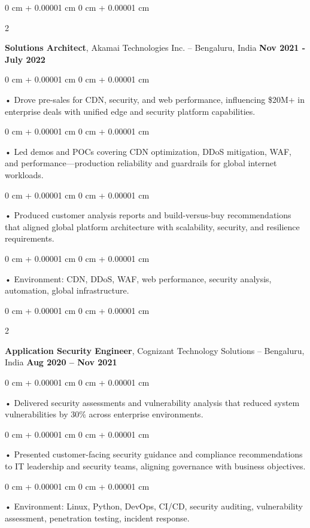 \documentclass[10pt, letterpaper]{article}
\newenvironment{onecolentry}{
    \begin{adjustwidth}{
        0 cm + 0.00001 cm
    }{
        0 cm + 0.00001 cm
    }
}{
    \end{adjustwidth}
} %
\newenvironment{twocolentry}[2][]{
    \onecolentry
    \def\secondColumn{#2}
    \setcolumnwidth{\fill, 4.5 cm}
    \begin{paracol}{2}
}{
    \switchcolumn \raggedleft \secondColumn
    \end{paracol}
    \endonecolentry
} %
\begin{document}
        \begin{twocolentry}{
            \textbf{Nov 2021 - July 2022}
        }
            \textbf{Solutions Architect}, Akamai Technologies Inc. -- Bengaluru, India \end{twocolentry}
        \begin{onecolentry}
            • Drove pre-sales for CDN, security, and web performance, influencing \$20M+ in enterprise deals with unified edge and security platform capabilities.
        \end{onecolentry}
        \begin{onecolentry}
            • Led demos and POCs covering CDN optimization, DDoS mitigation, WAF, and performance---production reliability and guardrails for global internet workloads.
        \end{onecolentry}
        \begin{onecolentry}
             • Produced customer analysis reports and build-versus-buy recommendations that aligned global platform architecture with scalability, security, and resilience requirements.
        \end{onecolentry}
        \begin{onecolentry}
             • Environment: CDN, DDoS, WAF, web performance, security analysis, automation, global infrastructure.
        \end{onecolentry}

        \begin{twocolentry}{
            \textbf{Aug 2020 – Nov 2021}
        }
            \vspace{2 pt }
            \textbf{Application Security Engineer}, Cognizant Technology Solutions -- Bengaluru, India\end{twocolentry}
        \begin{onecolentry}
             • Delivered security assessments and vulnerability analysis that reduced system vulnerabilities by 30\% across enterprise environments.
        \end{onecolentry}
        \begin{onecolentry}
             • Presented customer-facing security guidance and compliance recommendations to IT leadership and security teams, aligning governance with business objectives.
        \end{onecolentry}
        \begin{onecolentry}
             • Environment: Linux, Python, DevOps, CI/CD, security auditing, vulnerability assessment, penetration testing, incident response.
        \end{onecolentry}
    \vspace{2 pt }
\end{document}
